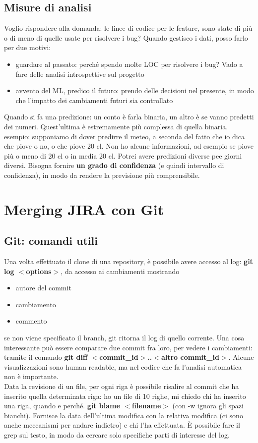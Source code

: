 \documentclass{article}
\begin{document}
\subsection{Misure di analisi}
Voglio rispondere alla domanda: le linee di codice per le feature, sono state di più o di meno di quelle usate per risolvere i bug? Quando gestisco i dati, posso farlo per due motivi:
\begin{itemize}
\item guardare al passato: perché spendo molte LOC per risolvere i bug? Vado a fare delle analisi introspettive sul progetto
\item avvento del ML, predico il futuro: prendo delle decisioni nel presente, in modo che l'impatto dei cambiamenti futuri sia controllato
\end{itemize}
Quando si fa una predizione: un conto è farla binaria, un altro è se vanno predetti dei numeri. Quest'ultima è estremamente più complessa di quella binaria.\\ esempio: supponiamo di dover predirre il meteo, a seconda del fatto che io dica che piove o no, o che piove 20 cl. Non ho alcune informazioni, ad esempio se piove più o meno di 20 cl o in media 20 cl. Potrei avere predizioni diverse pee giorni diversi. Bisogna fornire \textbf{un grado di confidenza} (e quindi intervallo di confidenza), in modo da rendere la previsione più comprensibile.
\section{Merging JIRA con Git}
\subsection{Git: comandi utili}
Una volta effettuato il clone di una repository, è possibile avere accesso al log: \textbf{git log $<$options$>$}, da accesso ai cambiamenti mostrando
\begin{itemize}
\item autore del commit
\item cambiamento
\item commento 
\end{itemize}
se non viene specificato il branch, git ritorna il log di quello corrente. Una cosa interessante può essere comparare due commit fra loro, per vedere i cambiamenti: tramite il comando \textbf{git diff $<$commit\_id$>$..$<$altro commit\_id$>$}. Alcune visualizzazioni sono human readable, ma nel codice che fa l'analisi automatica non è importante.\\
Data la revisione di un file, per ogni riga è possibile risalire al commit che ha inserito quella determinata riga: ho un file di 10 righe, mi chiedo chi ha inserito una riga, quando e perché. \textbf{git blame $<$filename$>$} (con -w ignora gli spazi bianchi). Fornisce la data dell'ultima modifica con la relativa modifica (ci sono anche meccanismi per andare indietro) e chi l'ha effettuata. È possibile fare il grep sul testo, in modo da cercare solo specifiche parti di interesse del log.
\end{document}
